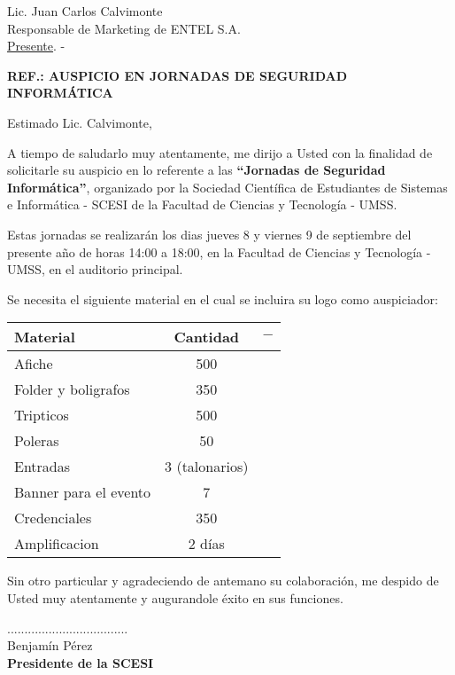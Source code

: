 \documentclass[letterpaper,12pt]{letter}
\begin{document}
\date {12 de agosto de 2011}

\begin{letter}{Lic. Juan Carlos Calvimonte \\ Responsable de Marketing de ENTEL S.A. \\\underline {Presente}. -}

\begin{center}
	\opening{\textbf{REF.: AUSPICIO EN JORNADAS DE SEGURIDAD INFORM\'ATICA}}
\end{center}

Estimado Lic. Calvimonte,

A tiempo de saludarlo muy atentamente, me dirijo a Usted con la finalidad de solicitarle su auspicio en lo referente 
a las {\bfseries ``Jornadas de Seguridad Inform\'atica''}, organizado por la Sociedad Cient\'ifica de Estudiantes de 
Sistemas e Inform\'atica - SCESI de la Facultad de Ciencias y Tecnolog\'ia - UMSS.

Estas jornadas se realizar\'an los dias jueves 8 y viernes 9 de septiembre del presente a\~no de horas 14:00 a 
18:00, en la Facultad de Ciencias y Tecnolog\'ia - UMSS, en el auditorio principal.

Se necesita el siguiente material en el cual se incluira su logo como auspiciador:

\begin{tabular}{|l|c|c|}
\hline
{\bfseries Material} & {\bfseries Cantidad} & $-$ \\
\hline
Afiche & 500 & \\
\hline
Folder y boligrafos & 350 & \\
\hline
Tripticos & 500 & \\
\hline
Poleras & 50 & \\
\hline
Entradas & 3 (talonarios) & \\
\hline
Banner para el evento & 7 & \\
\hline
Credenciales & 350 & \\
\hline
Amplificacion & 2 d\'ias & \\
\hline
\end{tabular}

Sin otro particular y agradeciendo de antemano su colaboraci\'on, me despido de Usted muy atentamente y augurandole \'exito en sus funciones.\\

\vspace{1cm}

\begin{center}
...................................\\
Benjam\'in P\'erez\\
{\bfseries Presidente de la  SCESI}
\end{center}

\end{letter}
\end{document}
